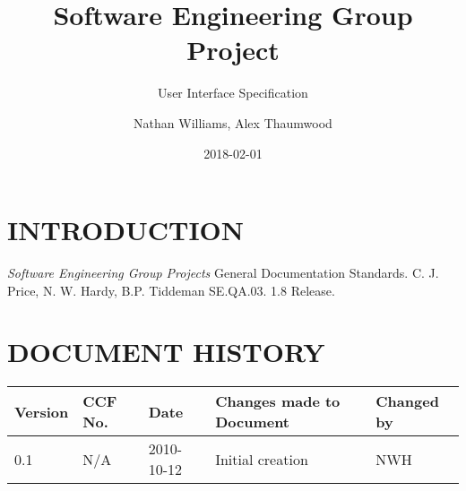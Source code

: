 \documentclass{project}
\begin{document}
\title{Software Engineering Group Project}
\subtitle{User Interface Specification}
\author{Nathan Williams, Alex Thaumwood}     
\date{2018-02-01}
\maketitle
\tableofcontents
\newpage
\section{INTRODUCTION}

\clearpage
{}
\begin{thebibliography}{5}
 \emph{Software Engineering Group Projects}
General Documentation Standards.
C. J. Price, N. W. Hardy, B.P. Tiddeman SE.QA.03. 1.8 Release.
\end{thebibliography}
\clearpage
{}
\section*{DOCUMENT HISTORY}
\begin{tabular}{|l | l | l | l | l |}
\hline
Version & CCF No. & Date & Changes made to Document & Changed by \\
\hline
0.1 & N/A & 2010-10-12 & Initial creation & NWH \\
\hline
\end{tabular}
\label{thelastpage}
\end{document}
